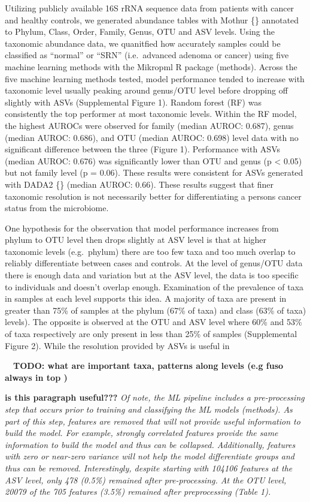 \documentclass[
]{article}
\begin{document}
Utilizing publicly available 16S rRNA sequence data from patients with
cancer and healthy controls, we generated abundance tables with Mothur
\{\} annotated to Phylum, Class, Order, Family, Genus, OTU and ASV
levels. Using the taxonomic abundance data, we quanitfied how accurately
samples could be classified as ``normal'' or ``SRN'' (i.e.~advanced
adenoma or cancer) using five machine learning methods with the Mikropml
R package (methods). Across the five machine learning methods tested,
model performance tended to increase with taxonomic level usually
peaking around genus/OTU level before dropping off slightly with ASVs
(Supplemental Figure 1). Random forest (RF) was consistently the top
performer at most taxonomic levels. Within the RF model, the highest
AUROCs were observed for family (median AUROC: 0.687), genus (median
AUROC: 0.686), and OTU (median AUROC: 0.698) level data with no
significant difference between the three (Figure 1). Performance with
ASVs (median AUROC: 0.676) was significantly lower than OTU and genus (p
\textless{} 0.05) but not family level (p = 0.06). These results were
consistent for ASVs generated with DADA2 \{\} (median AUROC: 0.66).
These results suggest that finer taxonomic resolution is not necessarily
better for differentiating a persons cancer status from the microbiome.

One hypothesis for the observation that model performance increases from
phylum to OTU level then drops slightly at ASV level is that at higher
taxonomic levels (e.g.~phylum) there are too few taxa and too much
overlap to reliably differentiate between cases and controls. At the
level of genus/OTU data there is enough data and variation but at the
ASV level, the data is too specific to individuals and doesn't overlap
enough. Examination of the prevalence of taxa in samples at each level
supports this idea. A majority of taxa are present in greater than 75\%
of samples at the phylum (67\% of taxa) and class (63\% of taxa)
levels). The opposite is observed at the OTU and ASV level where 60\%
and 53\% of taxa respectively are only present in less than 25\% of
samples (Supplemental Figure 2). While the resolution provided by ASVs
is useful in

~~\textbf{TODO: what are important taxa, patterns along levels (e.g fuso
always in top )}

\textbf{is this paragraph useful???} \emph{Of note, the ML pipeline
includes a pre-processing step that occurs prior to training and
classifying the ML models (methods). As part of this step, features are
removed that will not provide useful information to build the model. For
example, strongly correlated features provide the same information to
build the model and thus can be collapsed. Additionally, features with
zero or near-zero variance will not help the model differentiate groups
and thus can be removed. Interestingly, despite starting with 104106
features at the ASV level, only 478 (0.5\%) remained after
pre-processing. At the OTU level, 20079 of the 705 features (3.5\%)
remained after preprocessing (Table 1).}
\end{document}
